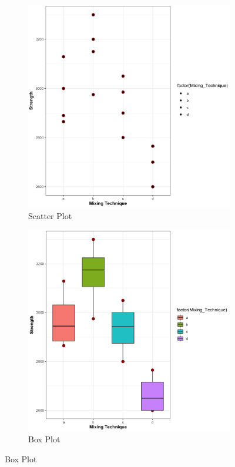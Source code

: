 \documentclass[11pt]{article}
\begin{document}
\begin{figure}[H]
    \centering
    \begin{subfigure}{0.45\textwidth}
        \includegraphics[width=\textwidth]{../pictures/hw2_q1_scatter.png}
        \caption{Scatter Plot}
    \end{subfigure}
    \begin{subfigure}{0.45\textwidth}
        \includegraphics[width=\textwidth]{../pictures/hw2_q1_box.png}
        \caption{Box Plot}
    \end{subfigure}
\end{figure}
\end{document}

